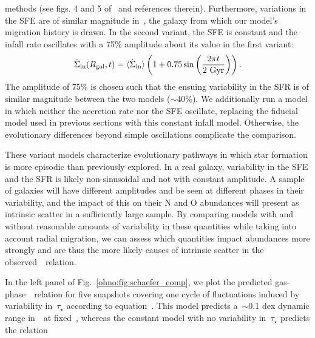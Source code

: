 methods (see figs. 4 and 5 of~\citealp{Tacconi2018} and references therein).
Furthermore, variations in the SFE are of similar magnitude in~\hsim, the
galaxy from which our model's migration history is drawn.
In the second variant, the SFE is constant and the infall rate oscillates with
a 75\% amplitude about its value in the first variant:
\begin{equation}
\dot{\Sigma}_\text{in}(R_\text{gal}, t) = \langle\dot{\Sigma}_\text{in}\rangle
\left(1 + 0.75\sin\left(\frac{2\pi t}{2~\text{Gyr}}\right)\right).
\label{ohno:eq:ifr_var}
\end{equation}
The amplitude of 75\% is chosen such that the ensuing variability in the SFR is
of similar magnitude between the two models ($\sim$40\%).
We additionally run a model in which neither the accretion rate nor the SFE
oscillate, replacing the fiducial model used in previous sections with this
constant infall model.
Otherwise, the evolutionary differences beyond simple oscillations complicate
the comparison.
\par
These variant models characterize evolutionary pathways in which star formation
is more episodic than previously explored.
In a real galaxy, variability in the SFE and the SFR is likely non-sinusoidal
and not with constant amplitude.
A sample of galaxies will have different amplitudes and be seen at different
phases in their variability, and the impact of this on their N and O abundances
will present as intrinsic scatter in a sufficiently large sample.
By comparing models with and without reasonable amounts of variability in these
quantities while taking into account radial migration, we can assess which
quantities impact abundances more strongly and are thus the more likely causes
of intrinsic scatter in the observed~\ohno~relation.
\par
In the left panel of Fig.~\ref{ohno:fig:schaefer_comp}, we plot the predicted
gas-phase~\ohno~relation for five snapshots covering one cycle of fluctuations
induced by variability in~$\tau_\star$ according to equation~.
This model predicts a~$\sim$0.1 dex dynamic range in~\no~at fixed~\oh, whereas
the constant model with no variability in~$\tau_\star$ predicts the relation
